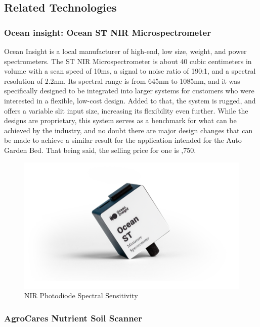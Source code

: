 \subsection{Related Technologies}

\subsubsection{Ocean insight: Ocean ST NIR Microspectrometer}



Ocean Insight is a local manufacturer of high-end, low size, weight, and power spectrometers. The ST NIR Microspectrometer is about 40 cubic centimeters in volume with a scan speed of 10ms, a signal to noise ratio of 190:1, and a spectral resolution of 2.2nm. Its spectral range is from 645nm to 1085nm, and it was specifically designed to be integrated into larger systems for customers who were interested in a flexible, low-cost design. Added to that, the system is rugged, and offers a variable slit input size, increasing its flexibility even further. While the designs are proprietary, this system serves as a benchmark for what can be achieved by the industry, and no doubt there are major design changes that can be made to achieve a similar result for the application intended for the Auto Garden Bed. That being said, the selling price for one is ,750.
\begin{figure}[H]
    \caption{NIR Photodiode Spectral Sensitivity}
    \centering
    \includegraphics[width=\textwidth]{images/3.2.1Pic.png}
\end{figure}
\subsubsection{AgroCares Nutrient Soil Scanner}

